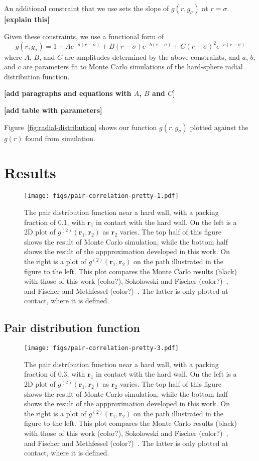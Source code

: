 \documentclass[letterpaper,twocolumn,amsmath,amssymb,pre,aps,10pt]{revtex4-1}
\newcommand{\red}[1]{{\bf \color{red} #1}}
\newcommand{\rr}{\textbf{r}}
\newcommand{\fixme}[1]{\red{[#1]}}
\begin{document}
An additional constraint that we use sets the slope of $g(r,
g_\sigma)$ at $r=\sigma$.  \fixme{explain this}

Given these constraints, we use a functional form of
\begin{equation}
  g(r,g_\sigma) = 1 + A e^{-a(r-\sigma)}
  + B (r-\sigma) e^{-b(r-\sigma)} + C (r-\sigma)^2 e^{-c(r-\sigma)}
\end{equation}
where $A$, $B$, and $C$ are amplitudes determined by the above
constraints, and $a$, $b$, and $c$ are parameters fit to Monte Carlo
simulations of the hard-sphere radial distribution function.

\fixme{add paragraphs and equations with $A$, $B$ and $C$}

\fixme{add table with parameters}


Figure~\ref{fig:radial-distribution} shows our function
$g(r,g_\sigma)$ plotted against the $g(r)$ found from simulation.

\newcommand\paircaption[1]{ The pair distribution function near a hard
  wall, with a packing fraction of #1, with $\rr_1$ in contact with
  the hard wall.  On the left is a 2D plot of $g^{(2)}(\rr_1,\rr_2)$
  as $\rr_2$ varies.  The top half of this figure shows the result of
  Monte Carlo simulation, while the bottom half shows the result of
  the appproximation developed in this work.  On the right is a plot
  of $g^{(2)}(\rr_1,\rr_2)$ on the path illustrated in the figure to
  the left.  This plot compares the Monte Carlo results (black) with
  those of this work (color?), Sokolowski and Fischer
  (color?)~\cite{sokolowski1992role}, and Fischer and Methfessel
  (color?)~\cite{fischer1980born}.  The latter is only plotted at
  contact, where it is defined.  }

\section{Results}

\begin{figure}
  \texttt{[image: figs/pair-correlation-pretty-1.pdf]}
  \caption{ \paircaption{0.1}
  }\label{fig:pair-distribution-1}
\end{figure}

\subsection{Pair distribution function}

\begin{figure}
  \texttt{[image: figs/pair-correlation-pretty-3.pdf]}
  \caption{\paircaption{0.3}}\label{fig:pair-distribution-3}
\end{figure}
\end{document}
